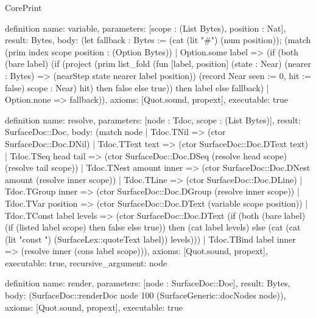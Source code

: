 \begin{lexlean}{CorePrint}
\begin{semanticmodule}
definition{
  name: variable,
  parameters: [scope : (List Bytes), position : Nat],
  result: Bytes,
  body: (let fallback : Bytes := (cat (lit "#") (num position)); (match (prim index scope position : (Option Bytes))
    | Option.some label => (if (both (bare label) (if (project (prim list_fold (fun [label, position] (state : Near) (nearer : Bytes) => (nearStep state nearer label position)) (record Near {seen := 0, hit := false}) scope : Near) hit) then false else true)) then label else fallback)
    | Option.none => fallback)),
  axioms: [Quot.sound, propext],
  executable: true
}

definition{
  name: resolve,
  parameters: [node : Tdoc, scope : (List Bytes)],
  result: SurfaceDoc::Doc,
  body: (match node
    | Tdoc.TNil => (ctor SurfaceDoc::Doc.DNil)
    | Tdoc.TText text => (ctor SurfaceDoc::Doc.DText text)
    | Tdoc.TSeq head tail => (ctor SurfaceDoc::Doc.DSeq (resolve head scope) (resolve tail scope))
    | Tdoc.TNest amount inner => (ctor SurfaceDoc::Doc.DNest amount (resolve inner scope))
    | Tdoc.TLine => (ctor SurfaceDoc::Doc.DLine)
    | Tdoc.TGroup inner => (ctor SurfaceDoc::Doc.DGroup (resolve inner scope))
    | Tdoc.TVar position => (ctor SurfaceDoc::Doc.DText (variable scope position))
    | Tdoc.TConst label levels => (ctor SurfaceDoc::Doc.DText (if (both (bare label) (if (listed label scope) then false else true)) then (cat label levels) else (cat (cat (lit "const ") (SurfaceLex::quoteText label)) levels)))
    | Tdoc.TBind label inner => (resolve inner (cons label scope))),
  axioms: [Quot.sound, propext],
  executable: true,
  recursive_argument: node
}

definition{
  name: render,
  parameters: [node : SurfaceDoc::Doc],
  result: Bytes,
  body: (SurfaceDoc::renderDoc node 100 (SurfaceGeneric::docNodes node)),
  axioms: [Quot.sound, propext],
  executable: true
}


\end{semanticmodule}
\end{lexlean}
